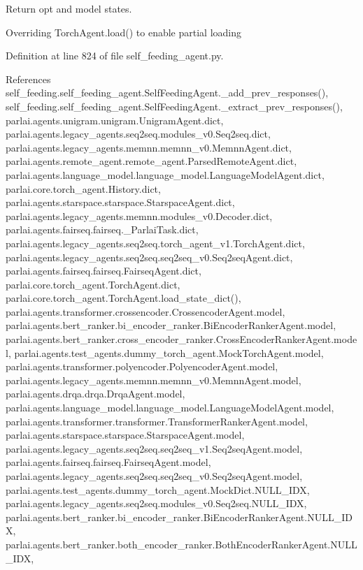 \begin{DoxyVerb}Return opt and model states.

Overriding TorchAgent.load() to enable partial loading
\end{DoxyVerb}
 

Definition at line 824 of file self\+\_\+feeding\+\_\+agent.\+py.



References self\+\_\+feeding.\+self\+\_\+feeding\+\_\+agent.\+Self\+Feeding\+Agent.\+\_\+add\+\_\+prev\+\_\+responses(), self\+\_\+feeding.\+self\+\_\+feeding\+\_\+agent.\+Self\+Feeding\+Agent.\+\_\+extract\+\_\+prev\+\_\+responses(), parlai.\+agents.\+unigram.\+unigram.\+Unigram\+Agent.\+dict, parlai.\+agents.\+legacy\+\_\+agents.\+seq2seq.\+modules\+\_\+v0.\+Seq2seq.\+dict, parlai.\+agents.\+legacy\+\_\+agents.\+memnn.\+memnn\+\_\+v0.\+Memnn\+Agent.\+dict, parlai.\+agents.\+remote\+\_\+agent.\+remote\+\_\+agent.\+Parsed\+Remote\+Agent.\+dict, parlai.\+agents.\+language\+\_\+model.\+language\+\_\+model.\+Language\+Model\+Agent.\+dict, parlai.\+core.\+torch\+\_\+agent.\+History.\+dict, parlai.\+agents.\+starspace.\+starspace.\+Starspace\+Agent.\+dict, parlai.\+agents.\+legacy\+\_\+agents.\+memnn.\+modules\+\_\+v0.\+Decoder.\+dict, parlai.\+agents.\+fairseq.\+fairseq.\+\_\+\+Parlai\+Task.\+dict, parlai.\+agents.\+legacy\+\_\+agents.\+seq2seq.\+torch\+\_\+agent\+\_\+v1.\+Torch\+Agent.\+dict, parlai.\+agents.\+legacy\+\_\+agents.\+seq2seq.\+seq2seq\+\_\+v0.\+Seq2seq\+Agent.\+dict, parlai.\+agents.\+fairseq.\+fairseq.\+Fairseq\+Agent.\+dict, parlai.\+core.\+torch\+\_\+agent.\+Torch\+Agent.\+dict, parlai.\+core.\+torch\+\_\+agent.\+Torch\+Agent.\+load\+\_\+state\+\_\+dict(), parlai.\+agents.\+transformer.\+crossencoder.\+Crossencoder\+Agent.\+model, parlai.\+agents.\+bert\+\_\+ranker.\+bi\+\_\+encoder\+\_\+ranker.\+Bi\+Encoder\+Ranker\+Agent.\+model, parlai.\+agents.\+bert\+\_\+ranker.\+cross\+\_\+encoder\+\_\+ranker.\+Cross\+Encoder\+Ranker\+Agent.\+model, parlai.\+agents.\+test\+\_\+agents.\+dummy\+\_\+torch\+\_\+agent.\+Mock\+Torch\+Agent.\+model, parlai.\+agents.\+transformer.\+polyencoder.\+Polyencoder\+Agent.\+model, parlai.\+agents.\+legacy\+\_\+agents.\+memnn.\+memnn\+\_\+v0.\+Memnn\+Agent.\+model, parlai.\+agents.\+drqa.\+drqa.\+Drqa\+Agent.\+model, parlai.\+agents.\+language\+\_\+model.\+language\+\_\+model.\+Language\+Model\+Agent.\+model, parlai.\+agents.\+transformer.\+transformer.\+Transformer\+Ranker\+Agent.\+model, parlai.\+agents.\+starspace.\+starspace.\+Starspace\+Agent.\+model, parlai.\+agents.\+legacy\+\_\+agents.\+seq2seq.\+seq2seq\+\_\+v1.\+Seq2seq\+Agent.\+model, parlai.\+agents.\+fairseq.\+fairseq.\+Fairseq\+Agent.\+model, parlai.\+agents.\+legacy\+\_\+agents.\+seq2seq.\+seq2seq\+\_\+v0.\+Seq2seq\+Agent.\+model, parlai.\+agents.\+test\+\_\+agents.\+dummy\+\_\+torch\+\_\+agent.\+Mock\+Dict.\+N\+U\+L\+L\+\_\+\+I\+DX, parlai.\+agents.\+legacy\+\_\+agents.\+seq2seq.\+modules\+\_\+v0.\+Seq2seq.\+N\+U\+L\+L\+\_\+\+I\+DX, parlai.\+agents.\+bert\+\_\+ranker.\+bi\+\_\+encoder\+\_\+ranker.\+Bi\+Encoder\+Ranker\+Agent.\+N\+U\+L\+L\+\_\+\+I\+DX, parlai.\+agents.\+bert\+\_\+ranker.\+both\+\_\+encoder\+\_\+ranker.\+Both\+Encoder\+Ranker\+Agent.\+N\+U\+L\+L\+\_\+\+I\+DX, 